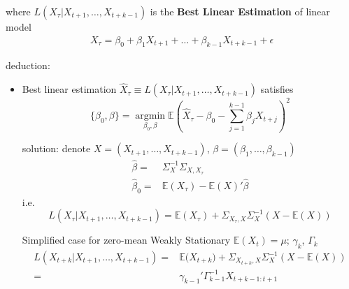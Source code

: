 \begin{itemize}[topsep=2pt,itemsep=0pt]
        where $ L(X_{\tau}|X_{t+1},\ldots,X_{t+k-1}) $ is the \textbf{Best Linear Estimation}  of linear model 
        \begin{align*}
             X_\tau = \beta _0+\beta _1X_{t+1}+\ldots+\beta _{k-1}X_{t+k-1}+\epsilon
        \end{align*}
        
           deduction:
        \begin{itemize}[topsep=2pt,itemsep=0pt]
            \item Best linear estimation $ \hat{X}_\tau \equiv L(X_\tau|X_{t+1},\ldots,X_{t+k-1}) $ satisfies 
            \begin{equation}
                \{\beta _0,\beta \}=\mathop{\arg\min}\limits_{\beta _0,\beta }  \mathbb{E}\left( \hat{X}_\tau-\beta _0-\sum_{j=1}^{k-1}\beta _jX_{t+j} \right)  ^2
            \end{equation}

            solution: denote $ X=(X_{t+1},\ldots,X_{t+k-1}) $, $ \beta =(\beta _1,\ldots,\beta _{k-1}) $
            \begin{align*}
                \hat{\beta }=&\Sigma ^{-1}_X\Sigma _{X,X_{\tau}}\\
                \hat{\beta }_0=&\mathbb{E}\left( X_{\tau} \right) -\mathbb{E}\left( X \right)' \hat{\beta }
            \end{align*}
            i.e.
            \begin{equation}\label{EqaBestLinearEstimationOfTS}
                L(X_\tau|X_{t+1},\ldots,X_{t+k-1}) =\mathbb{E}\left( X_{\tau} \right) + \Sigma _{X_\tau,X}\Sigma _X^{-1}(X-\mathbb{E}\left( X \right) )
            \end{equation}

            Simplified case for zero-mean Weakly Stationary $ \mathbb{E}(X_t)=\mu  $; $ \gamma _k $, $ \Gamma _k $
            \begin{align}\label{EqaBestLinearEstimationOfWSTS}
                L(X_{t+k}|X_{t+1},\ldots,X_{t+k-1}) =&\mathbb{E}\big( X_{t+k} \big) + \Sigma _{X_{t+k},X}\Sigma _X^{-1}(X-\mathbb{E}\left( X \right) )\\
                =&\gamma _{k-1}'\Gamma _{k-1}^{-1}X_{t+k-1:t+1}
            \end{align}
                
            
        \end{itemize}



\end{itemize}
